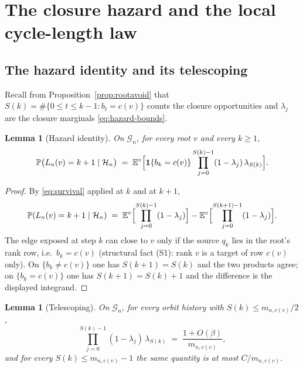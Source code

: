 \documentclass[11pt]{article}
\newcommand{\E}{\mathbb{E}}
\newcommand{\Prob}{\mathbb{P}}
\newcommand{\1}{\mathbf{1}}
\newcommand{\cG}{\mathcal{G}}
\newcommand{\cH}{\mathcal{H}}
\newtheorem{lemma}[theorem]{Lemma}
\theoremstyle{remark}
\begin{document}
\section{The closure hazard and the local cycle-length law}\label{sec:local}

\subsection{The hazard identity and its telescoping}
Recall from Proposition~\ref{prop:rootavoid} that
$S(k)=\#\{0\le t\le k-1:b_t=c(v)\}$ counts the closure opportunities and
$\lambda_j$ are the closure marginals \eqref{eq:hazard-bounds}.

\begin{lemma}[Hazard identity]\label{lem:hazard}
On $\cG_n$, for every root $v$ and every $k\ge1$,
\begin{equation}\label{eq:hazard}
\Prob\bigl(L_n(v)=k+1\mid\cH_n\bigr)
\;=\;\E^\circ\Bigl[\1\{b_k=c(v)\}
\prod_{j=0}^{S(k)-1}(1-\lambda_j)\,\lambda_{S(k)}\Bigr].
\end{equation}
\end{lemma}

\begin{proof}
By \eqref{eq:survival} applied at $k$ and at $k+1$,
\[
\Prob(L_n(v)=k+1\mid\cH_n)
\;=\;\E^\circ\Bigl[\prod_{j=0}^{S(k)-1}(1-\lambda_j)\Bigr]
-\E^\circ\Bigl[\prod_{j=0}^{S(k+1)-1}(1-\lambda_j)\Bigr].
\]
The edge exposed at step $k$ can close to $v$ only if the source $q_k$ lies
in the root's rank row, i.e.\ $b_k=c(v)$ (structural fact (S1): rank $v$ is
a target of row $c(v)$ only). On $\{b_k\ne c(v)\}$ one has
$S(k+1)=S(k)$ and the two products agree; on $\{b_k=c(v)\}$ one has
$S(k+1)=S(k)+1$ and the difference is the displayed integrand.
\end{proof}

\begin{lemma}[Telescoping]\label{lem:telescope}
On $\cG_n$, for every orbit history with $S(k)\le m_{n,c(v)}/2$,
\begin{equation}\label{eq:telescope}
\prod_{j=0}^{S(k)-1}(1-\lambda_j)\,\lambda_{S(k)}
\;=\;\frac{1+O(\beta)}{m_{n,c(v)}},
\end{equation}
and for every $S(k)\le m_{n,c(v)}-1$ the same quantity is at most
$C/m_{n,c(v)}$.
\end{lemma}
\end{document}
